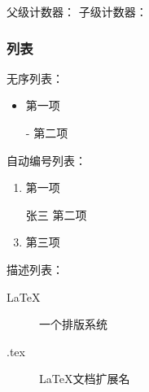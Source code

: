 \documentclass[twoside]{ctexart}
\begin{document}
            父级计数器： %
            子级计数器： %

        \subsubsection{列表}
            无序列表：
            \begin{itemize}
                \item 第一项 
                \item [-] 第二项 
            \end{itemize}

            自动编号列表：
            \begin{enumerate}
                \item 第一项
                \item [张三] 第二项 
                \item 第三项
            \end{enumerate}

            描述列表：
            \begin{description}
                \item[LaTeX] 一个排版系统
                \item[.tex] LaTeX文档扩展名  
            \end{description}
\end{document}

